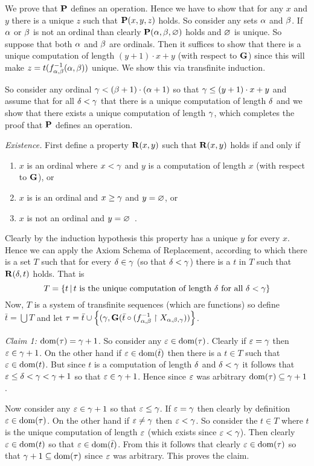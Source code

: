 {{    We prove that $\P$ defines an operation.
    Hence we have to show that  for any $x$ and $y$ there is a unique $z$ such that $\P(x,y,z)$ holds.
    So consider any sets $\a$ and $\b$.
    If $\a$ or $\b$ is not an ordinal than clearly $\P(\a,\b,\es)$ holds and $\es$ is unique.
    So suppose that both $\a$ and $\b$ are ordinals.
    Then it suffices to show that there is a unique computation of length $(y+1)\cdot x + y$ (with respect to $\G$) since this will make $z = t(\inv{f_{\a,\b}}(\a,\b))$ unique.
    We show this via transfinite induction.

    So consider any ordinal $\g < (\b+1) \cdot (\a+1)$ so that $\g \leq (y+1)\cdot x + y$ and assume that for all $\d < \g$ that there is a unique computation of length $\d$ and we show that there exists a unique computation of length $\g$, which completes the proof that $\P$ defines an operation.

    \emph{Existence.} First define a property $\R(x,y)$ such that $\R(x,y)$ holds if and only if
    \begin{enumerate}
    \item $x$ is an ordinal where $x < \g$ and $y$ is a computation of length $x$ (with respect to $\G$), or
    \item $x$ is is an ordinal and $x \geq \g$ and $y = \es$, or
    \item $x$ is not an ordinal and $y = \es$ \,.
    \end{enumerate}
    Clearly by the induction hypothesis this property has a unique $y$ for every $x$.
    Hence we can apply the Axiom Schema of Replacement, according to which there is a set $T$ such that for every $\d \in \g$ (so that $\d < \g$) there is a $t$ in $T$ such that $\R(\d, t)$ holds.
    That is
    $$
    T = \braces{t \where t \text{ is the unique computation of length $\d$ for all $\d < \g$}}
    $$
    Now, $T$ is a system of transfinite sequences (which are functions) so define $\bar{t} = \bigcup T$ and let $\t = \bar{t} \cup \braces{(\g, \G(\bar{t} \circ (\inv{f_{\a,\b}} \rest X_{\a,\b,\g}))}$.

    \emph{Claim 1:} $\dom(\t) = \g+1$.
    So consider any $\e \in \dom(\t)$.
    Clearly if $\e = \g$ then $\e \in \g+1$.
    On the other hand if $\e \in \dom(\bar{t})$ then there is a $t \in T$ such that $\e \in \dom(t)$.
    But since $t$ is a computation of length $\d$ and $\d < \g$ it follows that $\e \leq \d < \g < \g+1$ so that $\e \in \g+1$.
    Hence since $\e$ was arbitrary $\dom(\t) \ss \g+1$.

    Now consider any $\e \in \g+1$ so that $\e \leq \g$.
    If $\e = \g$ then clearly by definition $\e \in \dom(\t)$.
    On the other hand if $\e \neq \g$ then $\e < \g$.
    So consider the $t \in T$ where $t$ is the unique computation of length $\e$ (which exists since $\e < \g$).
    Then clearly $\e \in \dom(t)$ so that $\e \in \dom(\bar{t})$.
    From this it follows that clearly $\e \in \dom(\t)$ so that $\g+1 \ss \dom(\t)$ since $\e$ was arbitrary.
    This proves the claim.
    
}}
